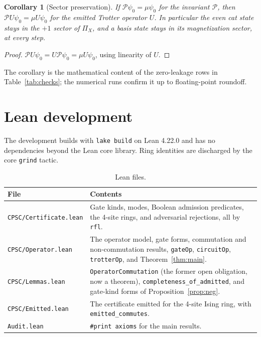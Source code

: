 \documentclass[11pt]{article}
\newtheorem{corollary}[theorem]{Corollary}
\theoremstyle{definition}
\newcommand{\lean}[1]{\texttt{#1}}
\newcommand{\PiX}{\Pi_X}
\begin{document}
\begin{corollary}[Sector preservation]
If $\mathcal{P}\psi_0 = \mu\psi_0$ for the invariant $\mathcal{P}$, then $\mathcal{P}U\psi_0 = \mu U\psi_0$ for the emitted Trotter operator $U$. In particular the even cat state stays in the $+1$ sector of $\PiX$, and a basis state stays in its magnetization sector, at every step.
\end{corollary}
\begin{proof}
$\mathcal{P}U\psi_0 = U\mathcal{P}\psi_0 = \mu U\psi_0$, using linearity of $U$.
\end{proof}
The corollary is the mathematical content of the zero-leakage rows in Table~\ref{tab:checks}; the numerical runs confirm it up to floating-point roundoff.

\section{Lean development}
\label{app:lean}

The development builds with \lean{lake build} on Lean 4.22.0 and has no dependencies beyond the Lean core library. Ring identities are discharged by the core \lean{grind} tactic.

\begin{table}[H]
\centering
\small
\begin{tabular}{@{}lL{10.4cm}@{}}
\toprule
File & Contents \\
\midrule
\lean{CPSC/Certificate.lean} & Gate kinds, modes, Boolean admission predicates, the 4-site rings, and adversarial rejections, all by \lean{rfl}. \\
\lean{CPSC/Operator.lean} & The operator model, gate forms, commutation and non-commutation results, \lean{gateOp}, \lean{circuitOp}, \lean{trotterOp}, and Theorem~\ref{thm:main}. \\
\lean{CPSC/Lemmas.lean} & \lean{OperatorCommutation} (the former open obligation, now a theorem), \lean{completeness\_of\_admitted}, and gate-kind forms of Proposition~\ref{prop:neg}. \\
\lean{CPSC/Emitted.lean} & The certificate emitted for the 4-site Ising ring, with \lean{emitted\_commutes}. \\
\lean{Audit.lean} & \lean{\#print axioms} for the main results. \\
\bottomrule
\end{tabular}
\caption{Lean files.}
\end{table}
\end{document}
